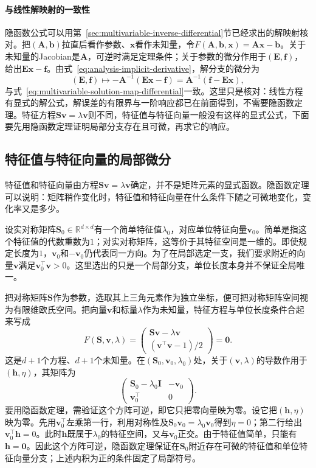 \paragraph{与线性解映射的一致性}
隐函数公式可以用第~\ref{sec:multivariable-inverse-differential}节已经求出的解映射核对。把$(\bm A,\bm b)$拉直后看作参数、$\bm x$看作未知量，令$F(\bm A,\bm b,\bm x)=\bm A\bm x-\bm b$。关于未知量的Jacobian是$\bm A$，可逆时满足定理条件；关于参数的微分作用于$(\bm E,\bm f)$，给出$\bm E\bm x-\bm f$。由式~\eqref{eq:analysis-implicit-derivative}，解分支的微分为
\[
 (\bm E,\bm f)\mapsto-\bm A^{-1}(\bm E\bm x-\bm f)=\bm A^{-1}(\bm f-\bm E\bm x),
\]
与式~\eqref{eq:multivariable-solution-map-differential}一致。这里只是核对：线性方程有显式的解公式，解误差的有限界与一阶响应都已在前面得到，不需要隐函数定理。特征方程$\bm S\bm v=\lambda\bm v$则不同，特征值与特征向量一般没有这样的显式公式，下面要先用隐函数定理证明局部分支存在且可微，再求它的响应。

\subsection{特征值与特征向量的局部微分}
\label{sec:multivariable-eigen-differential}

特征值和特征向量由方程$\bm S\bm v=\lambda\bm v$确定，并不是矩阵元素的显式函数。隐函数定理可以说明：矩阵稍作变化时，特征值和特征向量在什么条件下随之可微地变化，变化率又是多少。

设实对称矩阵$\bm S_0\in\mathbb R^{d\times d}$有一个简单特征值$\lambda_0$，对应单位特征向量$\bm v_0$。简单是指这个特征值的代数重数为$1$；对实对称矩阵，这等价于其特征空间是一维的。即使规定长度为$1$，$\bm v_0$和$-\bm v_0$仍代表同一方向。为了在局部选定一支，我们要求附近的向量$\bm v$满足$\bm v_0^\top\bm v>0$。这里选出的只是一个局部分支，单位长度本身并不保证全局唯一。

把对称矩阵$\bm S$作为参数，选取其上三角元素作为独立坐标，便可把对称矩阵空间视为有限维欧氏空间。把向量$\bm v$和标量$\lambda$作为未知量，特征方程与单位长度条件合起来写成
\[
 F(\bm S,\bm v,\lambda)=
 \begin{pmatrix}\bm S\bm v-\lambda\bm v\\ (\bm v^\top\bm v-1)/2\end{pmatrix}=\bm0.
\]
这是$d+1$个方程、$d+1$个未知量。在$(\bm S_0,\bm v_0,\lambda_0)$处，关于$(\bm v,\lambda)$的导数作用于$(\bm h,\eta)$，其矩阵为
\[
 \begin{pmatrix}\bm S_0-\lambda_0\bm I&-\bm v_0\\
 \bm v_0^\top&0\end{pmatrix}.
\]
要用隐函数定理，需验证这个方阵可逆，即它只把零向量映为零。设它把$(\bm h,\eta)$映为零。先用$\bm v_0^\top$左乘第一行，利用对称性及$\bm S_0\bm v_0=\lambda_0\bm v_0$得到$\eta=0$；第二行给出$\bm v_0^\top\bm h=0$。此时$\bm h$既属于$\lambda_0$的特征空间，又与$\bm v_0$正交。由于特征值简单，只能有$\bm h=\bm0$。因此这个方阵可逆，隐函数定理保证在$\bm S_0$附近存在可微的特征值和单位特征向量分支；上述内积为正的条件固定了局部符号。

